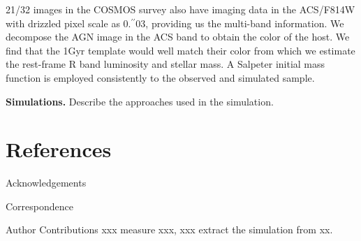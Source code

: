 \documentclass{natureprintstyle}
\newcommand{\hst}{{\it HST}}
\newcommand{\lhost}{$L_{\rm host}$}
\newcommand{\sersic}{S\'ersic}
\newcommand{\reff}{{$R_{\mathrm{eff}}$}}
\newcommand{\mstar}{{$M_*$}}
\newcommand{\farcs}{\mbox{\ensuremath{.\!\!^{\prime\prime}}}}%
\begin{document}
21/32 images in the COSMOS survey also have imaging data in the ACS/F814W with drizzled pixel scale as 0\farcs03, providing us the multi-band information. We decompose the AGN image in the ACS band to obtain the color of the host. We find that the 1Gyr template would well match their color from which we estimate the rest-frame R band luminosity and stellar mass. A Salpeter initial mass function is employed consistently to the observed and simulated sample.



\textbf{Simulations.} 
Describe the approaches used in the simulation.


\section*{References}
 


\begin{addendum}
 \item[Acknowledgements] 

%
\item[Correspondence] %
\item[Author Contributions] xxx measure xxx, xxx extract the simulation from xx.
\end{addendum}

\end{document}
